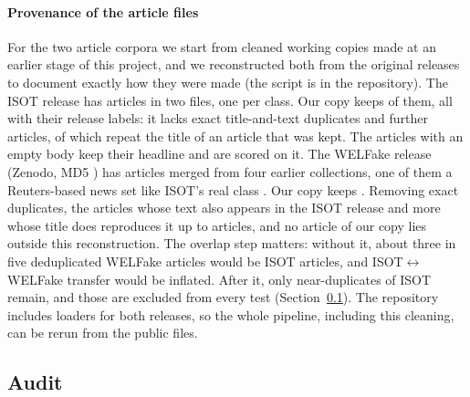 \paragraph{Provenance of the article files}
For the two article corpora we start from cleaned working copies made at an earlier stage of this project, and we reconstructed both from the original releases to document exactly how they were made (the script is in the repository). The ISOT release has \PvIsotRel{} articles in two files, one per class. Our copy keeps \PvIsotWork{} of them, all with their release labels: it lacks \PvIsotExact{} exact title-and-text duplicates and \PvIsotFurther{} further articles, \PvIsotFurtherTitle{} of which repeat the title of an article that was kept. The \PvIsotEmpty{} articles with an empty body keep their headline and are scored on it. The WELFake release (Zenodo, MD5 \texttt{\PvWelMD}) has \PvWelRel{} articles merged from four earlier collections, one of them a Reuters-based news set like ISOT's real class \citep{verma2021welfake,welfake2021data}. Our copy keeps \PvWelWork{}. Removing \PvWelExact{} exact duplicates, the \PvWelIsotText{} articles whose text also appears in the ISOT release and \PvWelIsotTitle{} more whose title does reproduces it up to \PvWelExtra{} articles, and no article of our copy lies outside this reconstruction. The overlap step matters: without it, about three in five deduplicated WELFake articles would be ISOT articles, and ISOT$\leftrightarrow$WELFake transfer would be inflated. After it, only \DupIW{} near-duplicates of ISOT remain, and those are excluded from every test (Section~\ref{sec:audit}). The repository includes loaders for both releases, so the whole pipeline, including this cleaning, can be rerun from the public files.



\subsection{Audit}\label{sec:audit}

